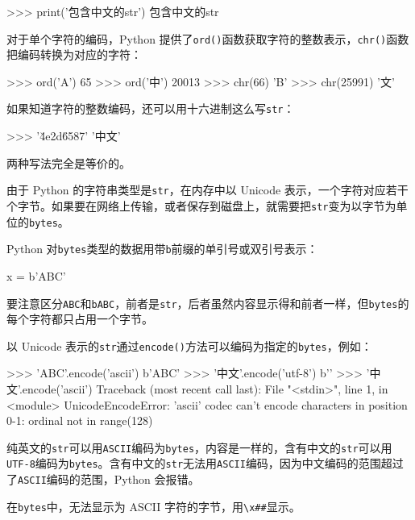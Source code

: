 \begin{pythoncode}
>>> print('包含中文的str')
包含中文的str
\end{pythoncode}

对于单个字符的编码，Python
提供了\texttt{ord()}函数获取字符的整数表示，\texttt{chr()}函数把编码转换为对应的字符：

\begin{pythoncode}
>>> ord('A')
65
>>> ord('中')
20013
>>> chr(66)
'B'
>>> chr(25991)
'文'
\end{pythoncode}

如果知道字符的整数编码，还可以用十六进制这么写\texttt{str}：

\begin{pythoncode}
>>> '\u4e2d\u6587'
'中文'
\end{pythoncode}

两种写法完全是等价的。

由于 Python 的字符串类型是\texttt{str}，在内存中以 Unicode
表示，一个字符对应若干个字节。如果要在网络上传输，或者保存到磁盘上，就需要把\texttt{str}变为以字节为单位的\texttt{bytes}。

Python
对\texttt{bytes}类型的数据用带\texttt{b}前缀的单引号或双引号表示：

\begin{pythoncode}
x = b'ABC'
\end{pythoncode}

要注意区分\texttt{\textquotesingle{}ABC\textquotesingle{}}和\texttt{b\textquotesingle{}ABC\textquotesingle{}}，前者是\texttt{str}，后者虽然内容显示得和前者一样，但\texttt{bytes}的每个字符都只占用一个字节。

以 Unicode
表示的\texttt{str}通过\texttt{encode()}方法可以编码为指定的\texttt{bytes}，例如：

\begin{pythoncode}
>>> 'ABC'.encode('ascii')
b'ABC'
>>> '中文'.encode('utf-8')
b'\xad{}'
>>> '中文'.encode('ascii')
Traceback (most recent call last):
  File "<stdin>", line 1, in <module>
UnicodeEncodeError: 'ascii' codec can't encode characters in position 0-1: ordinal not in range(128)
\end{pythoncode}

纯英文的\texttt{str}可以用\texttt{ASCII}编码为\texttt{bytes}，内容是一样的，含有中文的\texttt{str}可以用\texttt{UTF-8}编码为\texttt{bytes}。含有中文的\texttt{str}无法用\texttt{ASCII}编码，因为中文编码的范围超过了\texttt{ASCII}编码的范围，Python
会报错。

在\texttt{bytes}中，无法显示为 ASCII
字符的字节，用\texttt{\textbackslash{}x\#\#}显示。

